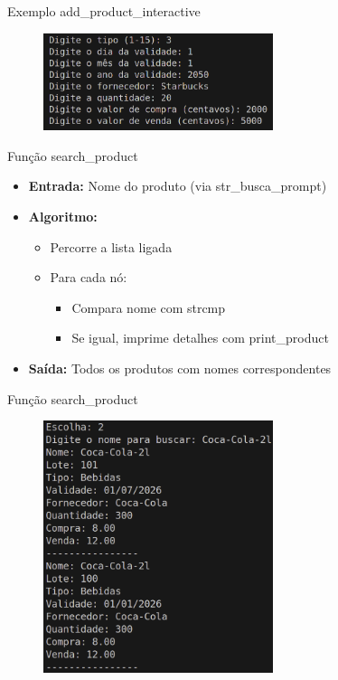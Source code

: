 \documentclass{beamer}
\begin{document}
\begin{frame}{Exemplo add\_product\_interactive}
    \begin{figure}
        \centering
        \includegraphics[width=0.6\textwidth]{img/add-2.png}
    \end{figure}
\end{frame}

\begin{frame}{Função search\_product}
    \begin{itemize}
        \item \textbf{Entrada:} Nome do produto (via str\_busca\_prompt)
        \item \textbf{Algoritmo:}
        \begin{itemize}
            \item Percorre a lista ligada
            \item Para cada nó:
            \begin{itemize}
                \item Compara nome com strcmp
                \item Se igual, imprime detalhes com print\_product
            \end{itemize}
        \end{itemize}
        \item \textbf{Saída:} Todos os produtos com nomes correspondentes
    \end{itemize}
\end{frame}

\begin{frame}{Função search\_product}
    \begin{figure}
        \centering
        \includegraphics[width=0.6\textwidth]{img/busca.png}
    \end{figure}
\end{frame}
\end{document}
